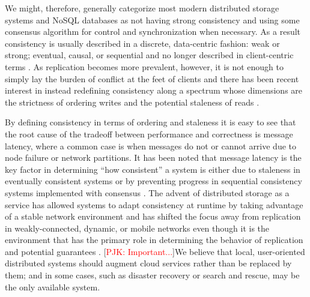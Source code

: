 \documentclass[10pt,conference,compsocconf,letterpaper]{IEEEtran}
\newcommand{\todo}[1]{{\textcolor{red}{#1}}}
\newcommand{\pjk}[1]{[\todo{PJK: #1}]}
\begin{document}
We might, therefore, generally categorize most modern distributed storage systems and NoSQL databases as not having strong consistency and using some consensus algorithm for control and synchronization when necessary. As a result consistency is usually described in a discrete, data-centric fashion: weak or strong; eventual, causal, or sequential and no longer described in client-centric terms \cite{bermbach_consistency_2013}. As replication becomes more prevalent, however, it is not enough to simply lay the burden of conflict at the feet of clients and there has been recent interest in instead redefining consistency along a spectrum whose dimensions are the strictness of ordering writes and the potential staleness of reads \cite{yu_design_2002,li_making_2012,afek_quasi-linearizability:_2010,al-ekram_multi-consistency_2010,krishnamurthy_adaptive_2002}.

By defining consistency in terms of ordering and staleness it is easy to see that the root cause of the tradeoff between performance and correctness is message latency, where a common case is when messages do not or cannot arrive due to node failure or network partitions. It has been noted that message latency is the key factor in determining ``how consistent'' a system is either due to staleness in eventually consistent systems \cite{bailis_probabilistically_2012} or by preventing progress in sequential consistency systems implemented with consensus \cite{howard_raft_2015}. The advent of distributed storage as a service has allowed systems to adapt consistency at runtime by taking advantage of a stable network environment \cite{chihoub_harmony:_2012,chihoub_consistency_2013,kraska_consistency_2009} and has shifted the focus away from replication in weakly-connected, dynamic, or mobile networks even though it is the environment that has the primary role in determining the behavior of replication and potential guarantees \cite{pitoura_data_1999,deno-toc}. \pjk{Important...}We believe that local, user-oriented distributed systems should augment cloud services rather than be replaced by them; and in some cases, such as disaster recovery or search and rescue, may be the only available system.
\end{document}
